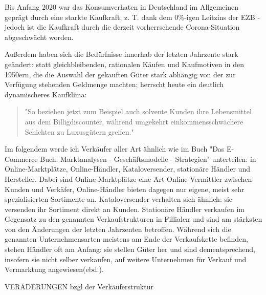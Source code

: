 \iffalse
Einteilung in: Online-Marktplätze + Online-Händler, Intermediäre, Kataloversender, stationäre Händler, Hersteller/Marken \cite{Graf}

entwicklung des kaufprozesses: graf:abbildung; 

https://edoc.sub.uni-hamburg.de/hcu/volltexte/2017/370/pdf/Ebert_Kirsten.pdf Anfang

änderung kaufablauf: \cite{Schaefers}
\fi

Bis Anfang 2020 war das Konsumverhaten in Deutschland im Allgemeinen geprägt durch eine starkte Kaufkraft, z. T. dank dem 0\%-igen Leitzins der \ac{EZB}\cite[S. 49]{Ebert} - jedoch ist die Kaufkraft durch die derzeit vorherrschende Corona-Situation abgeschwächt worden\cite{BfWE}. 

Außerdem haben sich die Bedürfnisse innerhab der letzten Jahrzente stark geändert: statt gleichbleibenden, rationalen Käufen und Kaufmotiven in den 1950ern, die die Auswahl der gekauften Güter stark abhängig von der zur Verfügung stehenden Geldmenge machten\cite[S. 38]{Schramm}; herrscht heute ein deutlich dynamischeres Kaufklima:
\begin{quote}
"So beziehen jetzt zum Beispiel auch solvente Kunden ihre Lebensmittel aus dem Billigdiscounter, während  umgekehrt  einkommensschwächere  Schichten  zu  Luxusgütern  greifen."\cite[S. 43]{Nitt}
\end{quote}

Im folgendem werde ich Verkäufer aller Art ähnlich wie im Buch "Das E-Commerce Buch: Marktanalysen - Geschäftsmodelle - Strategien" unterteilen: in Online-Marktplätze, Online-Händler, Kataloversender, stationäre Händler und Hersteller\cite[S. 18ff]{Graf}. Dabei sind Online-Marktplätze eine Art Online-Vermittler zwischen Kunden und Verkäfer, Online-Händler bieten dagegen nur eigene, meist sehr spezialisierten Sortimente an. Kataloversender verhalten sich ähnlich: sie versenden ihr Sortiment direkt an Kunden. Stationäre Händler verkaufen im Gegensatz zu den genannten Verkaufstrukturen in Fillialen und sind am stärksten von den Änderungen der letzten Jahrzenten betroffen. Während sich die genannten Unternehmensarten meistens am Ende der Verkaufskette befinden, stehen Händler oft am Anfang: sie stellen Güter her und sind dementsprechend, insofern sie nicht selber verkaufen, auf weitere Unternehmen für Verkauf und Vermarktung angewiesen(ebd.). %


\iffalse 
    VERÄDERUNGEN bzgl der Verkäuferstruktur
    
